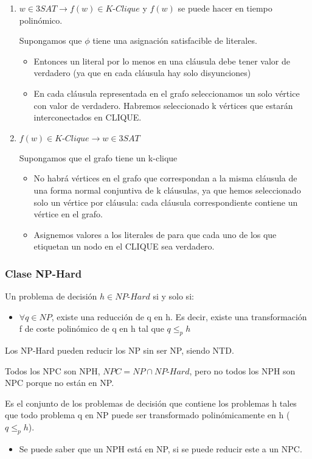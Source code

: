 \begin{enumerate}
  \item $w\in \textit{3SAT} \rightarrow f(w)\in \textit{K-Clique}$ y $f(w)$ se puede hacer en tiempo polinómico.
  
  Supongamos que $\phi$ tiene una asignación satisfacible de literales.
  \begin{itemize}
    \item Entonces un literal por lo menos en una cláusula debe tener valor de verdadero (ya que en cada cláusula hay solo disyunciones)
    \item En cada cláusula representada en el grafo seleccionamos un solo vértice con valor de verdadero. Habremos seleccionado k vértices que estarán interconectados en CLIQUE.
  \end{itemize}
  \item $f(w)\in \textit{K-Clique} \rightarrow w \in \textit{3SAT}$
  
  Supongamos que el grafo tiene un k-clique
  \begin{itemize}
    \item No habrá vértices en el grafo que correspondan a la misma cláusula de una forma normal conjuntiva de k cláusulas, ya que hemos seleccionado solo un vértice por cláusula: cada cláusula correspondiente contiene un vértice en el grafo.
    \item Asignemos valores a los literales de para que cada uno de los que etiquetan un nodo en el CLIQUE sea verdadero.
  \end{itemize}
\end{enumerate}

\subsubsection{Clase NP-Hard}
Un problema de decisión $h \in \textit{NP-Hard}$ si y solo si:
\begin{itemize}
  \item $\forall q \in NP$, existe una reducción de q en h. Es decir, existe una transformación f de coste polinómico de q en h tal que $q \leq_p h$
\end{itemize}

Los NP-Hard pueden reducir los NP sin ser NP, siendo NTD.

Todos los NPC son NPH, $\textit{NPC}=\textit{NP} \cap \textit{NP-Hard}$, pero no todos los NPH son NPC porque no están en NP.

Es el conjunto de los problemas de decisión que contiene los problemas h tales que todo problema q en NP puede ser transformado polinómicamente en h ($q \leq_p h$).
\begin{itemize}
  \item Se puede saber que un NPH está en NP, si se puede reducir este a un NPC.
\end{itemize}

